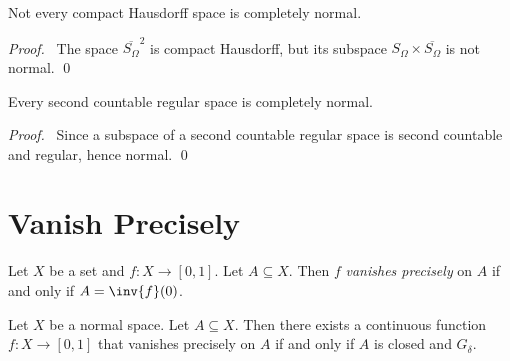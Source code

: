 \begin{example}
    Not every compact Hausdorff space is completely normal.
\end{example}

\begin{proof}
    \pf\ The space $\overline{S_\Omega}^2$ is compact Hausdorff, but its subspace
    $S_\Omega \times \overline{S_\Omega}$ is not normal. \qed
\end{proof}

\begin{proposition}
    Every second countable regular space is completely normal.
\end{proposition}

\begin{proof}
    \pf\ Since a subspace of a second countable regular space is second countable
    and regular, hence normal. \qed
\end{proof}

\section{Vanish Precisely}

\begin{definition}
Let $X$ be a set and $f : X \rightarrow [0,1]$. Let $A \subseteq X$. Then $f$
\emph{vanishes precisely} on $A$ if and only if $A = \inv{f}(0)$.    
\end{definition}

\begin{theorem}
    \label{theorem:vanish_precisely_closed_gdelta}
    Let $X$ be a normal space. Let $A \subseteq X$. Then there exists a 
    continuous function
    $f : X \rightarrow [0,1]$ that vanishes precisely on $A$ if and only if
    $A$ is closed and $G_\delta$.
\end{theorem}

